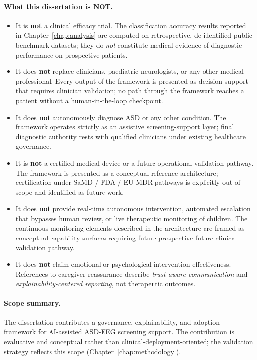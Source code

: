 \paragraph{What this dissertation is NOT.}
\begin{itemize}[leftmargin=*, itemsep=3pt]
    \item It is \textbf{not} a clinical efficacy trial. The classification accuracy results reported in Chapter~\ref{chap:analysis} are computed on retrospective, de-identified public benchmark datasets; they do \emph{not} constitute medical evidence of diagnostic performance on prospective patients.
    \item It does \textbf{not} replace clinicians, paediatric neurologists, or any other medical professional. Every output of the framework is presented as decision-support that requires clinician validation; no path through the framework reaches a patient without a human-in-the-loop checkpoint.
    \item It does \textbf{not} autonomously diagnose ASD or any other condition. The framework operates strictly as an assistive screening-support layer; final diagnostic authority rests with qualified clinicians under existing healthcare governance.
    \item It is \textbf{not} a certified medical device or a future-operational-validation pathway. The framework is presented as a conceptual reference architecture; certification under SaMD / FDA / EU MDR pathways is explicitly out of scope and identified as future work.
    \item It does \textbf{not} provide real-time autonomous intervention, automated escalation that bypasses human review, or live therapeutic monitoring of children. The continuous-monitoring elements described in the architecture are framed as conceptual capability surfaces requiring future prospective future clinical-validation pathway.
    \item It does \textbf{not} claim emotional or psychological intervention effectiveness. References to caregiver reassurance describe \emph{trust-aware communication} and \emph{explainability-centered reporting}, not therapeutic outcomes.
\end{itemize}

\paragraph{Scope summary.} The dissertation contributes a governance, explainability, and adoption framework for AI-assisted ASD-EEG screening support. The contribution is evaluative and conceptual rather than clinical-deployment-oriented; the validation strategy reflects this scope (Chapter~\ref{chap:methodology}).

